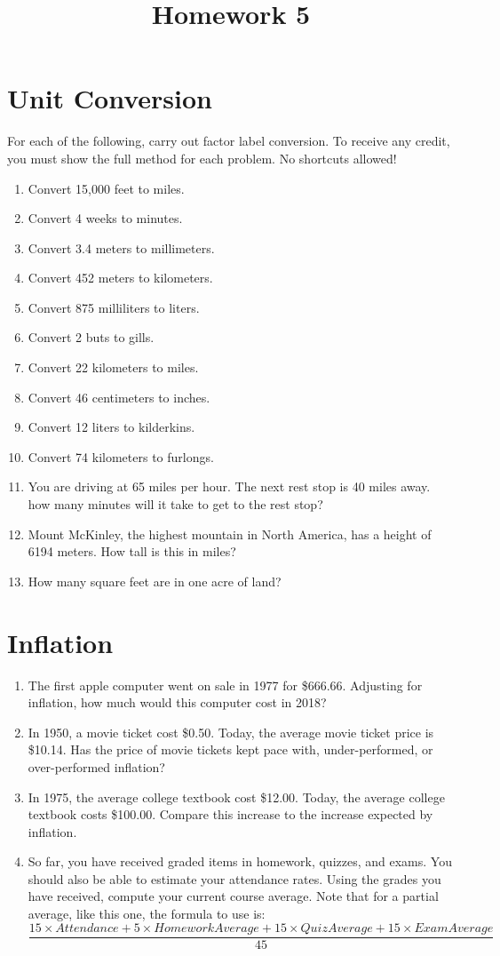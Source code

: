 \documentclass{article}
\title{Homework 5}
\date{}
\begin{document}
\maketitle

\section{Unit Conversion}
For each of the following, carry out factor label conversion.
To receive any credit, you must show the full method for each problem.
No shortcuts allowed!
\begin{enumerate}
    \item Convert 15,000 feet to miles.
    \item Convert 4 weeks to minutes.
    \item Convert 3.4 meters to millimeters.
    \item Convert 452 meters to kilometers.
    \item Convert 875 milliliters to liters.
    \item Convert 2 buts to gills.
    \item Convert 22 kilometers to miles.
    \item Convert 46 centimeters to inches.
    \item Convert 12 liters to kilderkins.
    \item Convert 74 kilometers to furlongs.
    \item You are driving at 65 miles per hour.  The next rest stop is 40 miles away.  how many minutes will it take to get to the rest stop?
    \item Mount McKinley, the highest mountain in North America, has a height of 6194 meters.  How tall is this in miles?
    \item How many square feet are in one acre of land?
\end{enumerate}

\section{Inflation}
\begin{enumerate}
    \item The first apple computer went on sale in 1977 for \$666.66.  Adjusting for inflation, how much would this computer cost in 2018?
    \item In 1950, a movie ticket cost \$0.50.  Today, the average movie ticket price is \$10.14.  Has the price of movie tickets kept pace with, under-performed, or over-performed inflation?
    \item In 1975, the average college textbook cost \$12.00.  Today, the average college textbook costs \$100.00.  Compare this increase to the increase expected by inflation.
    \item So far, you have received graded items in homework, quizzes, and exams.  You should also be able to estimate your attendance rates.  Using the grades you have received, compute your current course average. Note that for a partial average, like this one, the formula to use is:
    \[
        \displaystyle\frac{15\times Attendance + 5\times HomeworkAverage + 15 \times QuizAverage + 15 \times ExamAverage }{45}
    \]
\end{enumerate}
\end{document}
